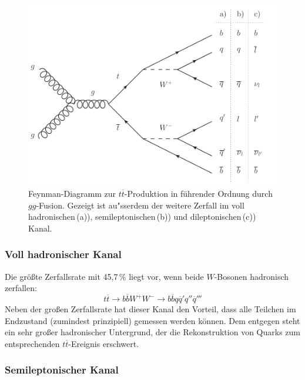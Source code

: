 \begin{figure}[ht]
	\centering
	\includegraphics[scale=0.80]{Theorie/leadingorderttproduction-eps-converted-to}
	\caption[Feynman-Diagramm zur $t\overline{t}$-Produktion in f"uhrender Ordnung durch $gg$-Fusion]{Feynman-Diagramm zur $t\overline{t}$-Produktion in f\"uhrender Ordnung durch $gg$-Fusion. Gezeigt ist au"sserdem der weitere Zerfall im voll hadronischen\,(a)), semi\-lep\-tonischen\,(b)) und dileptonischen\,(c)) Kanal.}
	\label{leadingorderttbar}
\end{figure}

\subsubsection*{Voll hadronischer Kanal}
Die gr\"o\ss{}te Zerfallsrate mit 45,7\,\% liegt vor, wenn beide $W$-Bosonen hadronisch zerfallen:
\begin{equation*}
t\overline{t}\rightarrow b\overline{b}W^{+}W^{-}\rightarrow b\overline{b}q\overline{q}'q''\overline{q}'''
\end{equation*}
Neben der gro\ss{}en Zerfallsrate hat dieser Kanal den Vorteil, dass alle Teilchen im Endzustand (zumindest prinzipiell) gemessen werden k\"onnen. Dem entgegen steht ein sehr gro\ss{}er hadronischer Untergrund, der die Rekonstruktion von Quarks zum entsprechenden $t\overline{t}$-Ereignis erschwert.

\subsubsection*{Semileptonischer Kanal}

